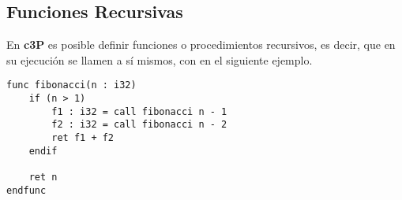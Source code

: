 \subsection{Funciones Recursivas}

En \textbf{c3P} es posible definir funciones o procedimientos recursivos,
es decir, que en su ejecución se llamen a sí mismos, con en el siguiente ejemplo.

\begin{verbatim}
func fibonacci(n : i32)
    if (n > 1)
        f1 : i32 = call fibonacci n - 1
        f2 : i32 = call fibonacci n - 2
        ret f1 + f2
    endif

    ret n
endfunc
\end{verbatim}
